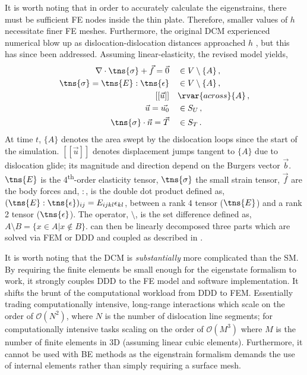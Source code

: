 It is worth noting that in order to accurately calculate the eigenstrains, there must be sufficient FE nodes inside the thin plate. Therefore, smaller values of $ h $ necessitate finer FE meshes. Furthermore, the original DCM experienced numerical blow up as dislocation-dislocation distances approached $ h $ \cite{dcm0}, but this has since been addressed. Assuming linear-elasticity, the revised model \cite{dcm} yields,
\begin{subequations}\label{eq:discrete_continuum}
    \begin{align}
        \nabla \cdot \tns{\sigma} + \vec{f} = \vec{0} \quad & \in V \setminus \{A\}\,, \\
        \tns{\sigma} = \tns{E} : \tns{\epsilon} \quad       & \in V \setminus \{A\}\,, \\
        [[\vec{u}]] \quad                                   & \rvar{across } \{A\}\,,  \\
        \vec{u} = \vec{u_{0}} \quad                         & \in S_{U}\,,             \\
        \tns{\sigma} \cdot \vec{n} = \vec{T} \quad          & \in S_{T}\,.
    \end{align}
\end{subequations}
At time $ t $, $ \{A\} $ denotes the area swept by the dislocation loops since the start of the simulation. $ [[\vec{u}]] $ denotes displacement jumps tangent to $ \{A\} $ due to dislocation glide; its magnitude and direction depend on the Burgers vector $ \vec{b} $. $ \tns{E} $ is the 4\textsuperscript{th}-order elasticity tensor, $ \tns{\sigma} $ the small strain tensor, $ \vec{f} $ are the body forces and, $ : $, is the double dot product defined as, $ (\tns{E}:\tns{\epsilon})_{ij} = E_{ijkl}\epsilon_{kl} $, between a rank 4 tensor ($ \tns{E} $) and a rank 2 tensor ($ \tns{\epsilon} $). The operator, $ \setminus $, is the set difference defined as, $ A \setminus B = \{x \in A | x \notin B\} $.  can then be linearly decomposed three parts which are solved via FEM or DDD and coupled as described in \cite{dcm}.

It is worth noting that the DCM is \emph{substantially} more complicated than the SM. By requiring the finite elements be small enough for the eigenstate formalism to work, it strongly couples DDD to the FE model and software implementation. It shifts the brunt of the computational workload from DDD to FEM. Essentially trading computationally intensive, long-range interactions which scale on the order of $ \mathcal{O}(N^{2}) $, where $ N $ is the number of dislocation line segments; for computationally intensive tasks scaling on the order of $ \mathcal{O}(M^{3}) $ where $ M $ is the number of finite elements in 3D (assuming linear cubic elements). Furthermore, it cannot be used with BE methods as the eigenstrain formalism demands the use of internal elements rather than simply requiring a surface mesh.

